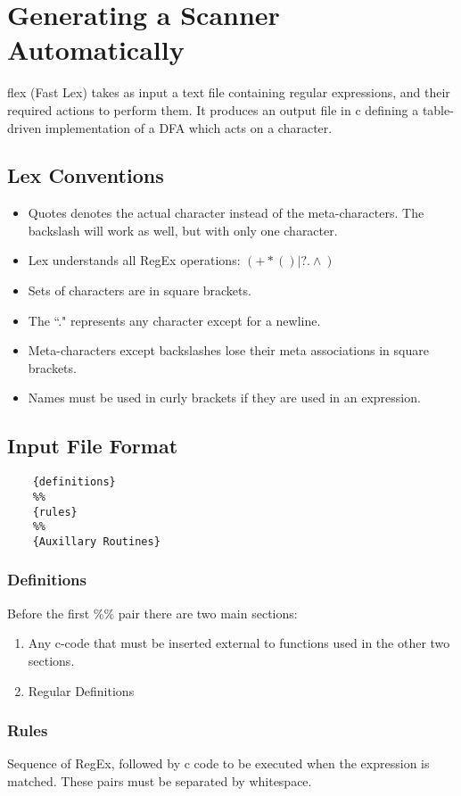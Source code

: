 \documentclass{report}
\theoremstyle{definition}
\begin{document}
	\section{Generating a Scanner Automatically}
		flex (Fast Lex) takes as input a text file containing regular expressions, and their required actions to perform them. It 
		produces an output file in c defining a table-driven implementation of a DFA which acts on a character.
		\subsection{Lex Conventions}
			\begin{itemize}
				\item Quotes denotes the actual character instead of the meta-characters. The backslash will 
					work as well, but with only one character.
				\item Lex understands all RegEx operations: $(+ * ( ) | ? . \wedge)$
				\item Sets of characters are in square brackets.
				\item The ``." represents any character except for a newline.
				\item Meta-characters except backslashes lose their meta associations in square brackets.
				\item Names must be used in curly brackets if they are used in an expression.
			\end{itemize}
\newpage
		\subsection{Input File Format}
\begin{lstlisting}
	{definitions}
	%%
	{rules}
	%%
	{Auxillary Routines}
\end{lstlisting}
			\subsubsection{Definitions}
				Before the first \%\% pair there are two main sections:
				\begin{enumerate}
					\item Any c-code that must be inserted external to functions used in the other two sections.
					\item Regular Definitions
				\end{enumerate}
			\subsubsection{Rules}
				Sequence of RegEx, followed by c code to be executed when the expression is matched. These pairs 
				must be separated by whitespace.
\end{document}
